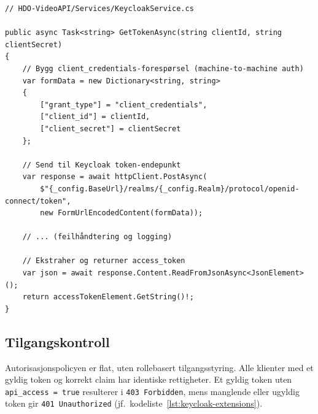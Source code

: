 \begin{lstlisting}[language={[Sharp]C}, label=lst:keycloak-service, caption={\texttt{KeycloakService.cs} – kall mot Keycloak}]
// HDO-VideoAPI/Services/KeycloakService.cs

public async Task<string> GetTokenAsync(string clientId, string clientSecret)
{
    // Bygg client_credentials-forespørsel (machine-to-machine auth)
    var formData = new Dictionary<string, string>
    {
        ["grant_type"] = "client_credentials",
        ["client_id"] = clientId,
        ["client_secret"] = clientSecret
    };

    // Send til Keycloak token-endepunkt
    var response = await httpClient.PostAsync(
        $"{_config.BaseUrl}/realms/{_config.Realm}/protocol/openid-connect/token", 
        new FormUrlEncodedContent(formData));

    // ... (feilhåndtering og logging)

    // Ekstraher og returner access_token
    var json = await response.Content.ReadFromJsonAsync<JsonElement>();
    return accessTokenElement.GetString()!;
}
\end{lstlisting}

\subsection{Tilgangskontroll}

Autorisasjonspolicyen er flat, uten rollebasert tilgangsstyring. Alle klienter med et gyldig token og korrekt claim har identiske rettigheter. Et gyldig token uten \texttt{api\_access = true} resulterer i \texttt{403 Forbidden}, mens manglende eller ugyldig token gir \texttt{401 Unauthorized} (jf.\ kodeliste~\ref{lst:keycloak-extensions}).

